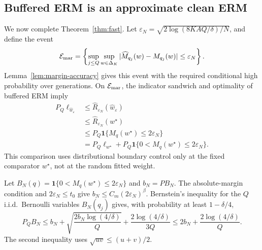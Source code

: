 \subsection{Buffered ERM is an approximate clean ERM}

We now complete Theorem~\ref{thm:fast}.  Let
\(\varepsilon_N=\sqrt{2\log(8KAQ/\delta)/N}\), and define the event
\[
\mathcal E_{\rm mar}
=
\left\{
\sup_{j\le Q}\sup_{w\in\Delta_K}
|\widehat M_{q_j}(w)-M_{q_j}(w)|
\le\varepsilon_N
\right\}.
\]
Lemma~\ref{lem:margin-accuracy} gives this event with the required conditional
high probability over generations.  On \(\mathcal E_{\rm mar}\), the indicator
sandwich and optimality of buffered ERM imply
\[
\begin{aligned}
P_Q\ell_{\widehat w_\varepsilon}
&\le
\widehat R_{\varepsilon_N}(\widehat w_\varepsilon)\\
&\le
\widehat R_{\varepsilon_N}(w^\star)\\
&\le
P_Q\mathbf 1\{M_q(w^\star)\le2\varepsilon_N\}\\
&=
P_Q\ell_{w^\star}
+
P_Q\mathbf 1\{0<M_q(w^\star)\le2\varepsilon_N\}.
\end{aligned}
\tag{C}
\label{eq:app-approx-erm-chain}
\]
This comparison uses distributional boundary control only at the fixed
comparator \(w^\star\), not at the random fitted weight.

Let \(B_N(q)=\mathbf 1\{0<M_q(w^\star)\le2\varepsilon_N\}\) and
\(b_N=PB_N\).  The absolute-margin condition and
\(2\varepsilon_N\le t_0\) give
\(b_N\le C_m(2\varepsilon_N)^\beta\).
Bernstein's inequality for the \(Q\) i.i.d.\ Bernoulli variables \(B_N(q_j)\)
gives, with probability at least \(1-\delta/4\),
\[
P_QB_N
\le
b_N+\sqrt{\frac{2b_N\log(4/\delta)}{Q}}
+
\frac{2\log(4/\delta)}{3Q}
\le
2b_N+\frac{2\log(4/\delta)}{Q}.
\tag{E}
\label{eq:app-band-concentration}
\]
The second inequality uses \(\sqrt{uv}\le(u+v)/2\).

